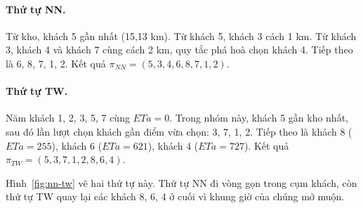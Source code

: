 \paragraph{Thứ tự NN.} Từ kho, khách 5 gần nhất (15,13 km). Từ khách 5, khách 3 cách 1 km. Từ khách 3,
khách 4 và khách 7 cùng cách 2 km, quy tắc phá hoà chọn khách 4. Tiếp theo là 6, 8, 7, 1, 2. Kết quả
$\pi_{NN} = (5, 3, 4, 6, 8, 7, 1, 2)$.

\paragraph{Thứ tự TW.} Năm khách 1, 2, 3, 5, 7 cùng $ETa = 0$. Trong nhóm này, khách 5 gần kho nhất, sau
đó lần lượt chọn khách gần điểm vừa chọn: 3, 7, 1, 2. Tiếp theo là khách 8 ($ETa = 255$), khách 6
($ETa = 621$), khách 4 ($ETa = 727$). Kết quả $\pi_{TW} = (5, 3, 7, 1, 2, 8, 6, 4)$.

Hình~\ref{fig:nn-tw} vẽ hai thứ tự này. Thứ tự NN đi vòng gọn trong cụm khách, còn thứ tự TW quay lại
các khách 8, 6, 4 ở cuối vì khung giờ của chúng mở muộn.

